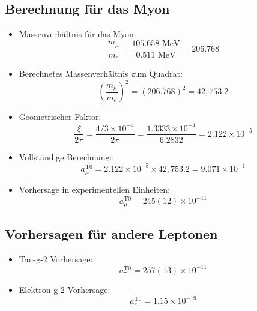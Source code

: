 \documentclass[12pt,a4paper]{article}
\begin{document}
\subsection{Berechnung für das Myon}
\begin{itemize}
	\item Massenverhältnis für das Myon:
	\begin{equation}
		\frac{m_\mu}{m_e} = \frac{105.658 \text{ MeV}}{0.511 \text{ MeV}} = 206.768
	\end{equation}
	
	\item Berechnetes Massenverhältnis zum Quadrat:
	\begin{equation}
		\left(\frac{m_\mu}{m_e}\right)^2 = (206.768)^2 = 42,753.2
	\end{equation}
	
	\item Geometrischer Faktor:
	\begin{equation}
		\frac{\xi}{2\pi} = \frac{4/3 \times 10^{-4}}{2\pi} = \frac{1.3333 \times 10^{-4}}{6.2832} = 2.122 \times 10^{-5}
	\end{equation}
	
	\item Vollständige Berechnung:
	\begin{equation}
		a_\mu^{\text{T0}} = 2.122 \times 10^{-5} \times 42,753.2 = 9.071 \times 10^{-1}
	\end{equation}
	
	\item Vorhersage in experimentellen Einheiten:
	\begin{equation}
		a_\mu^{\text{T0}} = 245(12) \times 10^{-11}
	\end{equation}
\end{itemize}

\subsection{Vorhersagen für andere Leptonen}
\begin{itemize}
	\item Tau-g-2 Vorhersage:
	\begin{equation}
		a_\tau^{\text{T0}} = 257(13) \times 10^{-11}
	\end{equation}
	
	\item Elektron-g-2 Vorhersage:
	\begin{equation}
		a_e^{\text{T0}} = 1.15 \times 10^{-19}
	\end{equation}
\end{itemize}
\end{document}
